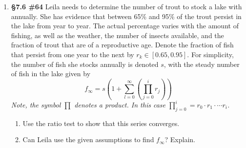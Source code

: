 \documentclass[%
]{article}
\begin{document}
\begin{enumerate}
\item {\bf \S7.6 \#64} Leila needs to determine the number of trout to stock a lake with annually.  She has evidence that between 65\% and 95\% of the trout persist in the lake from year to year.  The actual percentage varies with the amount of fishing, as well as the weather, the number of insects available, and the fraction of trout that are of a reproductive age.  Denote the fraction of fish that persist from one year to the next by $r_k\in[0.65,0.95]$.  For simplicity, the number of fish she stocks annually is denoted $s$, with the steady number of fish in the lake given by
\[
f_{\infty}=s\left(1+\sum_{l=0}^{\infty}\left(\prod_{j=0}^{i}r_j\right)\right)
\]
\textit{Note, the symbol $\prod$ denotes a product.  In this case $\prod_{j=0}^{i}=r_0\cdot r_1\cdot \cdots r_i$.}
	\begin{enumerate}
	\item Use the ratio test to show that this series converges.
	\item Can Leila use the given assumptions to find $f_{\infty}$?  Explain.
	\end{enumerate}


	

	
\end{enumerate}
\end{document}
